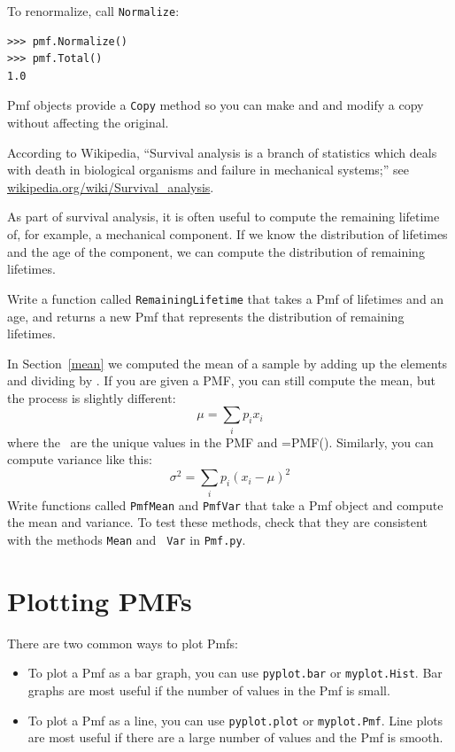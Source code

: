 \documentclass[12pt]{book}
\begin{document}
To renormalize, call {\tt Normalize}:
%
\begin{verbatim}
>>> pmf.Normalize()
>>> pmf.Total()
1.0
\end{verbatim}

Pmf objects provide a {\tt Copy} method so you can make and
and modify a copy without affecting the original.

\begin{exercise}
According to Wikipedia, ``Survival analysis is a branch of statistics
which deals with death in biological organisms and failure in
mechanical systems;'' see \url{wikipedia.org/wiki/Survival_analysis}.

As part of survival analysis, it is often useful to compute the
remaining lifetime of, for example, a mechanical component.  If we
know the distribution of lifetimes and the age of the component,
we can compute the distribution of remaining lifetimes.

Write a function called {\tt RemainingLifetime} that takes a
Pmf of lifetimes and an age, and returns a new Pmf that represents
the distribution of remaining lifetimes.

\end{exercise}


\begin{exercise}
%
%
In Section~\ref{mean} we computed the mean of a sample by adding up
the elements and dividing by \n.  If you are given a PMF, you can
still compute the mean, but the process is slightly different:
%
\[ \mu = \sum_i p_i x_i \]
%
where the \xsubi~are the unique values in the PMF and \psubi=PMF(\xsubi).
Similarly, you can compute variance like this:
%
\[ \sigma^2 = \sum_i p_i (x_i - \mu)^2\]
% 
Write functions called {\tt PmfMean} and {\tt PmfVar} that take a
Pmf object and compute the mean and variance.  To test these methods,
check that they are consistent with the methods {\tt Mean} and {\tt
  Var} in {\tt Pmf.py}.

\end{exercise}




\section{Plotting PMFs}

There are two common ways to plot Pmfs:

\begin{itemize}

\item To plot a Pmf as a bar graph, you can use {\tt pyplot.bar}
or {\tt myplot.Hist}.  Bar graphs are most useful if the number
of values in the Pmf is small.

\item To plot a Pmf as a line, you can use {\tt pyplot.plot}
or {\tt myplot.Pmf}.  Line plots are most useful if there are
a large number of values and the Pmf is smooth.

\end{itemize}
\end{document}
